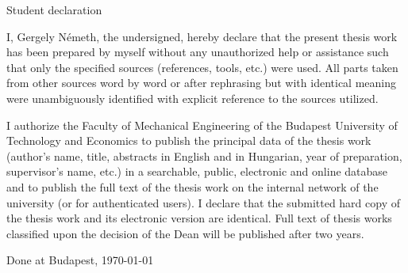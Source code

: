 Student declaration

I, Gergely Németh, the undersigned, hereby declare that the present thesis work has been prepared by myself without any unauthorized help or assistance such that only the specified sources (references, tools, etc.) were used. All parts taken from other sources word by word or after rephrasing but with identical meaning were unambiguously identified with explicit reference to the sources utilized.

I authorize the Faculty of Mechanical Engineering of the Budapest University of Technology and Economics to publish the principal data of the thesis work (author's name, title, abstracts in English and in Hungarian, year of preparation, supervisor's name, etc.) in a searchable, public, electronic and online database and to publish the full text of the thesis work on the internal network of the university (or for authenticated users). I declare that the submitted hard copy of the thesis work and its electronic version are identical. Full text of thesis works classified upon the decision of the Dean will be published after two years.

Done at Budapest, \today